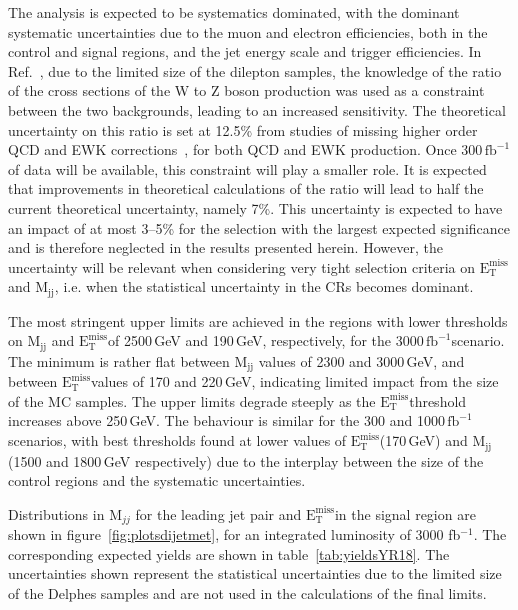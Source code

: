 \documentclass[../report.tex]{subfiles}
\newcommand{\MET}{\ensuremath{\mathrm{E}_{\mathrm{T}}^{\mathrm{miss}}}}
\newcommand{\fbinv}{\ensuremath{\,\text{fb}^{-1}\xspace}}
\begin{document}
The analysis is expected to be systematics dominated, with the
dominant systematic uncertainties due to the muon and electron
efficiencies, both in the control and signal regions, and the jet
energy scale and trigger efficiencies. In
Ref.~\cite{Sirunyan:2018owy}, due to the limited size of the dilepton
samples, the knowledge of the ratio of the cross sections of the W to
Z boson production was used as a constraint between the two
backgrounds, leading to an increased sensitivity. The theoretical
uncertainty on this ratio is set at 12.5\% from studies of missing
higher order QCD and EWK corrections~\cite{Sirunyan:2018owy}, for both
QCD and EWK production. Once 300\fbinv of data will be available, this
constraint will play a smaller role. It is expected that improvements
in theoretical calculations of the ratio will lead to half the current
theoretical uncertainty, namely 7\%.  This uncertainty is expected to
have an impact of at most 3--5\% for the selection with the largest
expected significance and is therefore neglected in the results
presented herein. However, the uncertainty will be relevant when
considering very tight selection criteria on \MET and M$_{\text{jj}}$,
i.e. when the statistical uncertainty in the CRs becomes dominant.


The most stringent upper limits are achieved in the regions with lower
thresholds on M$_{\text{jj}}$ and \MET of 2500\,GeV and 190\,GeV,
respectively, for the 3000\fbinv scenario. The minimum is rather flat
between M$_{\text{jj}}$ values of 2300 and 3000\,GeV, and between
\MET values of 170 and 220\,GeV, indicating limited impact from the size of the MC
samples. The upper limits degrade steeply as the \MET threshold
increases above 250\,GeV. The behaviour is similar for the 300 and
1000\fbinv scenarios, with best thresholds found at lower values
of \MET (170\,GeV) and M$_{\text{jj}}$ (1500 and 1800\,GeV respectively)
due to the interplay between the size of the control regions and the
systematic uncertainties.

Distributions in M$_{jj}$ for
the leading jet pair and \MET in the signal region are shown in
figure~\ref{fig:plotsdijetmet}, for an integrated luminosity of 3000 fb$^{-1}$. The
corresponding expected yields are shown in
table~\ref{tab:yieldsYR18}. The uncertainties shown represent the statistical 
uncertainties due to the limited size of the Delphes samples and are not used in the calculations
of the final limits.
\end{document}
